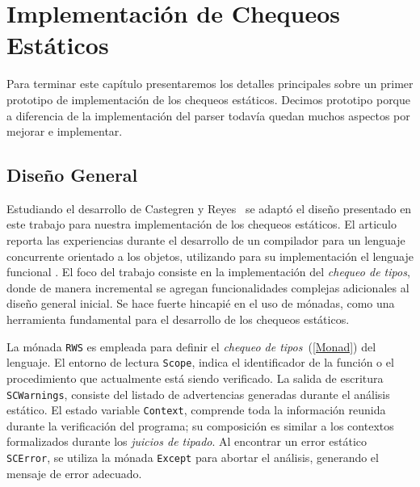 \section{Implementación de Chequeos Estáticos}

Para terminar este capítulo presentaremos los detalles principales sobre un
primer prototipo de implementación de los chequeos estáticos. Decimos prototipo porque a diferencia de la implementación del parser todavía quedan
muchos aspectos por mejorar e implementar.


\subsection{Diseño General}

Estudiando el desarrollo de Castegren y Reyes~\cite{MonadicTC} se adaptó el diseño presentado en este trabajo para nuestra implementación de los chequeos estáticos.
El articulo reporta las experiencias durante el desarrollo de un compilador para un lenguaje concurrente orientado a los objetos, utilizando para su implementación el lenguaje funcional \Haskell{}.
El foco del trabajo consiste en la implementación del \textit{chequeo de tipos}, donde de manera incremental se agregan funcionalidades complejas adicionales al diseño general inicial.
Se hace fuerte hincapié en el uso de mónadas, como una herramienta fundamental para el desarrollo de los chequeos estáticos.


La mónada \lstinline[style = haskell]{RWS} es empleada para definir el \textit{chequeo de tipos}~(\ref{Monad}) del lenguaje.
El entorno de lectura \lstinline[style = haskell]{Scope}, indica el identificador de la función o el procedimiento que actualmente está siendo verificado.
La salida de escritura \lstinline[style = haskell]{SCWarnings}, consiste del listado de advertencias generadas durante el análisis estático.
El estado variable \lstinline[style = haskell]{Context}, comprende toda la información reunida durante la verificación del programa; su composición es similar a los contextos formalizados durante los \textit{juicios de tipado}.
Al encontrar un error estático \lstinline[style = haskell]{SCError}, se utiliza la mónada \lstinline[style = haskell]{Except} para abortar el análisis, generando el mensaje de error adecuado.

